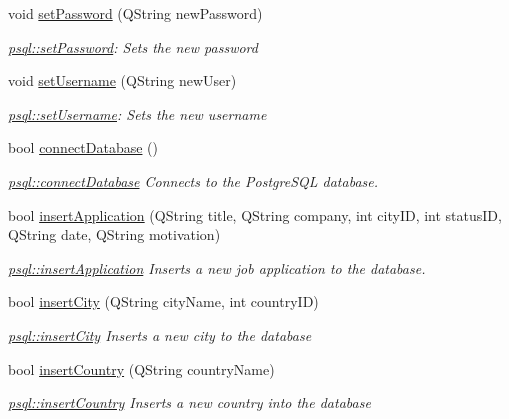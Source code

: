 \begin{DoxyCompactItemize}
void \hyperlink{classpsql_a6c29350037550b7e5a5bb8f439c405f3}{set\+Password} (Q\+String new\+Password)
\begin{DoxyCompactList}\small\item\em \hyperlink{classpsql_a6c29350037550b7e5a5bb8f439c405f3}{psql\+::set\+Password}\+: Sets the new password \end{DoxyCompactList}\item 
void \hyperlink{classpsql_a1488a9e4909abd172651b7be240342cb}{set\+Username} (Q\+String new\+User)
\begin{DoxyCompactList}\small\item\em \hyperlink{classpsql_a1488a9e4909abd172651b7be240342cb}{psql\+::set\+Username}\+: Sets the new username \end{DoxyCompactList}\item 
bool \hyperlink{classpsql_ada485c933df77453629e3821ab19fa4c}{connect\+Database} ()
\begin{DoxyCompactList}\small\item\em \hyperlink{classpsql_ada485c933df77453629e3821ab19fa4c}{psql\+::connect\+Database} Connects to the Postgre\+S\+QL database. \end{DoxyCompactList}\item 
bool \hyperlink{classpsql_a03f773904e698853caa0fcdb1f5b3809}{insert\+Application} (Q\+String title, Q\+String company, int city\+ID, int status\+ID, Q\+String date, Q\+String motivation)
\begin{DoxyCompactList}\small\item\em \hyperlink{classpsql_a03f773904e698853caa0fcdb1f5b3809}{psql\+::insert\+Application} Inserts a new job application to the database. \end{DoxyCompactList}\item 
bool \hyperlink{classpsql_a767b85014d9df3eac148730f18888d6d}{insert\+City} (Q\+String city\+Name, int country\+ID)
\begin{DoxyCompactList}\small\item\em \hyperlink{classpsql_a767b85014d9df3eac148730f18888d6d}{psql\+::insert\+City} Inserts a new city to the database \end{DoxyCompactList}\item 
bool \hyperlink{classpsql_ab3b5934ce3fbc4be1730d990d4142893}{insert\+Country} (Q\+String country\+Name)
\begin{DoxyCompactList}\small\item\em \hyperlink{classpsql_ab3b5934ce3fbc4be1730d990d4142893}{psql\+::insert\+Country} Inserts a new country into the database \end{DoxyCompactList}\item 

\end{DoxyCompactItemize}

